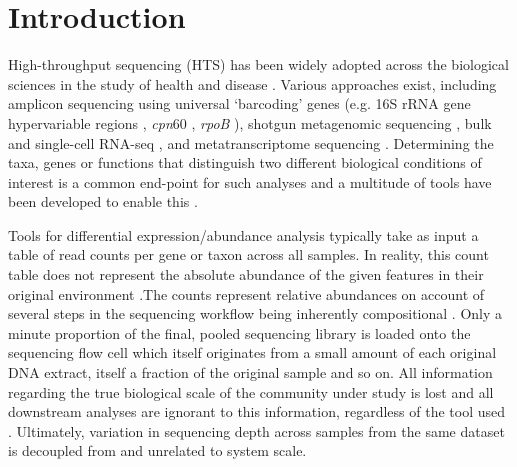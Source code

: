 \documentclass[10pt,letterpaper]{article}
\begin{document}
\linenumbers


\section*{Introduction}

High-throughput sequencing (HTS) has been widely adopted across the biological sciences in the study of health and disease \cite{malla_exploring_2019, Montgomery:2022aa}. Various approaches exist, including amplicon sequencing using universal `barcoding' genes (e.g. 16S rRNA gene hypervariable regions \cite{johnson_evaluation_2019}, \textit{cpn}60 \cite{vancuren_variant_2020}, \textit{rpoB} \cite{ogier_rpob_2019}), shotgun metagenomic sequencing \cite{quince_shotgun_2017}, bulk and single-cell RNA-seq \cite{gate_clonally_2020,jovic_single_2022}, and metatranscriptome sequencing \cite{france_insight_2022}. Determining the taxa, genes or functions that distinguish two different biological conditions of interest is a common end-point for such analyses and a multitude of tools have been developed to enable this \cite{Quinn:2019aa, liu_practical_2021}.

Tools for differential expression/abundance analysis typically take as input a table of read counts per gene or taxon across all samples. In reality, this count table does not represent the absolute abundance of the given features in their original environment \cite{gloor_its_2016,vandeputte_quantitative_2017}.The counts represent relative abundances on account of several steps in the sequencing workflow being inherently compositional \cite{gloor_compositional_2016}. Only a minute proportion of the final, pooled sequencing library is loaded onto the sequencing flow cell which itself originates from a small amount of each original DNA extract, itself a fraction of the original sample and so on. All information regarding the true biological scale of the community under study is lost and all downstream analyses are ignorant to this information, regardless of the tool used \cite{lovell_proportions_2011}. Ultimately, variation in sequencing depth across samples from the same dataset is decoupled from and unrelated to system scale.
\end{document}
